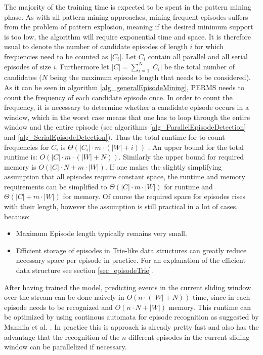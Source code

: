 The majority of the training time is expected to be spent in the pattern mining phase. As with all pattern mining approaches, mining frequent episodes suffers from the problem of pattern explosion, meaning if the desired minimum support is too low, the algorithm will require exponential time and space. It is therefore usual to denote the number of candidate episodes of length $i$ for which frequencies need to be counted as $|C_i|$. Let $C_i$ contain all parallel and all serial episodes of size $i$. Furthermore let $|C| = \sum_{i=1}^N |C_i|$ be the total number of candidates ($N$ being the maximum episode length that needs to be considered). As it can be seen in algorithm \ref{alg_generalEpisodeMining}, PERMS needs to count the frequency of each candidate episode once. In order to count the frequency, it is necessary to determine whether a candidate episode occurs in a window, which in the worst case means that one has to loop through the entire window and the entire episode (see algorithms \ref{alg_ParallelEpisodeDetection} and \ref{alg_SerialEpisodeDetection}). Thus the total runtime for to count frequencies for $C_i$ is $\Theta(|C_i| \cdot m \cdot(|W| + i))$ . An upper bound for the total runtime is: $O(|C| \cdot m \cdot(|W| + N))$. Similarly the upper bound for required memory is $O(|C|\cdot N + m \cdot |W|)$. If one makes the slightly simplifying assumption that all episodes require constant space, the runtime and memory requirements can be simplified to $\Theta(|C| \cdot m \cdot |W| )$ for runtime and $\Theta(|C| + m \cdot |W|)$ for memory. Of course the required space for episodes rises with their length, however the assumption is still practical in a lot of cases, because:

\begin{itemize}
	\item Maximum Episode length typically remains very small.
	\item Efficient storage of episodes in Trie-like data structures can greatly reduce necessary space per episode in practice. For an explanation of the efficient data structure see section \ref{sec_episodeTrie}.
\end{itemize}

After having trained the model, predicting events in the current sliding window over the stream can be done naively in $O(n \cdot (|W|+N))$ time, since in each episode needs to be recognized and $O(n \cdot N + |W|)$ memory. This runtime can be optimized by using continous automata for episode recognition as suggested by Mannila et al. \cite{mannila1997discovery}. In practice this is approach is already pretty fast and also has the advantage that the recognition of the $n$ different episodes in the current sliding window can be parallelized if necessary.

